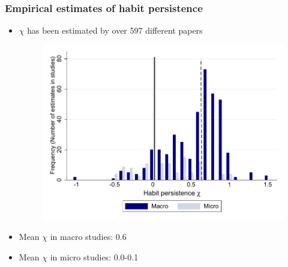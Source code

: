 \documentclass[10pt,english,t,10pt]{beamer}
\begin{document}
\begin{frame}
\frametitle{Empirical estimates of habit persistence}

\begin{itemize}
	\item $\chi$ has been estimated by over 597 different papers
	\begin{figure}
		\begin{center}
			\includegraphics[width=.75\textwidth]{../Figures/microMacroMetaHistogram}
		\end{center}
	\end{figure}
	\item  Mean $\chi$ in macro studies: 0.6
	\item Mean $\chi$ in micro studies: 0.0-0.1 
\end{itemize}

\end{frame}
\end{document}
